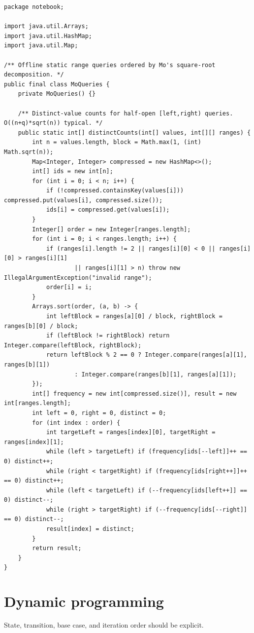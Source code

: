 \documentclass[10pt,letterpaper]{article}
\begin{document}
\begin{lstlisting}
package notebook;

import java.util.Arrays;
import java.util.HashMap;
import java.util.Map;

/** Offline static range queries ordered by Mo's square-root decomposition. */
public final class MoQueries {
    private MoQueries() {}

    /** Distinct-value counts for half-open [left,right) queries. O((n+q)*sqrt(n)) typical. */
    public static int[] distinctCounts(int[] values, int[][] ranges) {
        int n = values.length, block = Math.max(1, (int) Math.sqrt(n));
        Map<Integer, Integer> compressed = new HashMap<>();
        int[] ids = new int[n];
        for (int i = 0; i < n; i++) {
            if (!compressed.containsKey(values[i])) compressed.put(values[i], compressed.size());
            ids[i] = compressed.get(values[i]);
        }
        Integer[] order = new Integer[ranges.length];
        for (int i = 0; i < ranges.length; i++) {
            if (ranges[i].length != 2 || ranges[i][0] < 0 || ranges[i][0] > ranges[i][1]
                    || ranges[i][1] > n) throw new IllegalArgumentException("invalid range");
            order[i] = i;
        }
        Arrays.sort(order, (a, b) -> {
            int leftBlock = ranges[a][0] / block, rightBlock = ranges[b][0] / block;
            if (leftBlock != rightBlock) return Integer.compare(leftBlock, rightBlock);
            return leftBlock % 2 == 0 ? Integer.compare(ranges[a][1], ranges[b][1])
                    : Integer.compare(ranges[b][1], ranges[a][1]);
        });
        int[] frequency = new int[compressed.size()], result = new int[ranges.length];
        int left = 0, right = 0, distinct = 0;
        for (int index : order) {
            int targetLeft = ranges[index][0], targetRight = ranges[index][1];
            while (left > targetLeft) if (frequency[ids[--left]]++ == 0) distinct++;
            while (right < targetRight) if (frequency[ids[right++]]++ == 0) distinct++;
            while (left < targetLeft) if (--frequency[ids[left++]] == 0) distinct--;
            while (right > targetRight) if (--frequency[ids[--right]] == 0) distinct--;
            result[index] = distinct;
        }
        return result;
    }
}
\end{lstlisting}
\section{Dynamic programming}
\begin{guidebox}State, transition, base case, and iteration order should be explicit.\end{guidebox}
\end{document}
